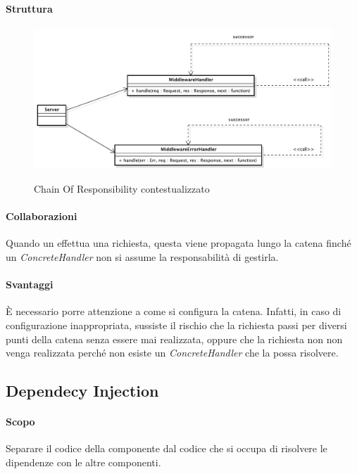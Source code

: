 \paragraph{Struttura}
\begin{center}
\begin{figure}[h]
\centering
\includegraphics[scale=0.33,keepaspectratio]{diagrammi/designPatterns/ChainOfPremi.pdf}\label{chainOfPremi}
\caption{Chain Of Responsibility contestualizzato}
\end{figure}
\FloatBarrier
\end{center}
\paragraph{Collaborazioni}
Quando un  effettua una richiesta, questa viene propagata lungo la catena finché un \textit{ConcreteHandler} non si assume la responsabilità di gestirla.
\paragraph{Svantaggi}
\`E necessario porre attenzione a come si configura la catena. Infatti, in caso di configurazione inappropriata, sussiste il rischio che la richiesta passi per diversi punti della catena senza essere mai realizzata, oppure che la richiesta non non venga realizzata perché non esiste un \textit{ConcreteHandler} che la possa risolvere.
\subsection{Dependecy Injection}\label{Dependency Injection}
\paragraph{Scopo}
Separare il codice della componente dal codice che si occupa di risolvere le dipendenze con le altre componenti.
